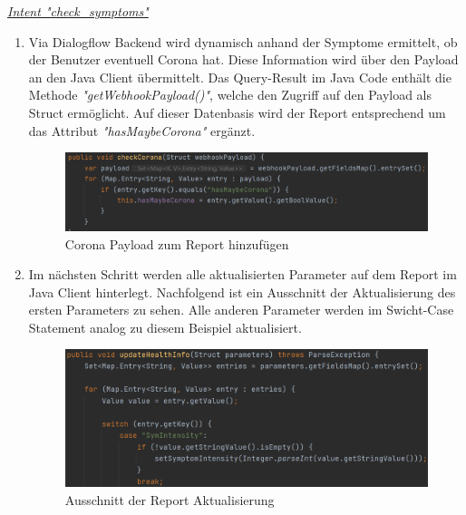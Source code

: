 \documentclass[11pt,a4paper]{article}
\begin{document}
		
				\underline{\emph{Intent "check\_symptoms"}} \\
				\begin{enumerate}
					\item Via Dialogflow Backend wird dynamisch anhand der Symptome ermittelt, ob der Benutzer eventuell Corona hat.
						Diese Information wird über den Payload an den Java Client übermittelt. Das Query-Result im Java Code enthält 
						die Methode \emph{"getWebhookPayload()"}, welche den Zugriff auf den Payload als Struct ermöglicht. Auf dieser
						Datenbasis wird der Report entsprechend um das Attribut \emph{"hasMaybeCorona"} ergänzt.
						\begin{figure}[h!]
							\begin{center}
			            		\includegraphics[width=1.0\linewidth]{JavaClient-CoronaCheck.png}
								\caption{Corona Payload zum Report hinzufügen}
								\label{fig:javaClient_coronaCheck}
							\end{center}
						\end{figure}
					
					\item Im nächsten Schritt werden alle aktualisierten Parameter auf dem Report im Java Client hinterlegt. 
						Nachfolgend ist ein Ausschnitt der Aktualisierung des ersten Parameters zu sehen. Alle anderen Parameter 
						werden im Swicht-Case Statement analog zu diesem Beispiel aktualisiert.
						\begin{figure}[h!]
							\begin{center}
			            		\includegraphics[width=0.9\linewidth]{JavaClient-ParameterHandling.png}
								\caption{Ausschnitt der Report Aktualisierung}
								\label{fig:javaClient_parameterHandling}
							\end{center}
						\end{figure}
				\end{enumerate}
		
\end{document}
